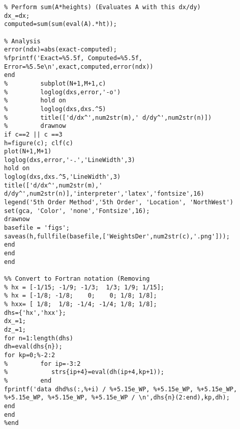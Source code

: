 \begin{verbatim}
% Perform sum(A*heights) (Evaluates A with this dx/dy)
dx_=dx;
computed=sum(sum(eval(A).*ht));

% Analysis
error(ndx)=abs(exact-computed);
%fprintf('Exact=%5.5f, Computed=%5.5f, Error=%5.5e\n',exact,computed,error(ndx))
end
%         subplot(N+1,M+1,c)
%         loglog(dxs,error,'-o')
%         hold on
%         loglog(dxs,dxs.^5)
%         title(['d/dx^',num2str(m),' d/dy^',num2str(n)])
%         drawnow 
if c==2 || c ==3 
h=figure(c); clf(c)  
plot(N+1,M+1)
loglog(dxs,error,'-.','LineWidth',3)
hold on
loglog(dxs,dxs.^5,'LineWidth',3)
title(['d/dx^',num2str(m),' d/dy^',num2str(n)],'interpreter','latex','fontsize',16)
legend('5th Order Method','5th Order', 'Location', 'NorthWest')
set(gca, 'Color', 'none','Fontsize',16);
drawnow 
basefile = 'figs';
saveas(h,fullfile(basefile,['WeightsDer',num2str(c),'.png']));
end
end
end

%% Convert to Fortran notation (Removing
% hx = [-1/15; -1/9; -1/3;  1/3; 1/9; 1/15];
% hx = [-1/8; -1/8;    0;    0; 1/8; 1/8];
% hxx= [ 1/8;  1/8; -1/4; -1/4; 1/8; 1/8];
dhs={'hx','hxx'};
dx_=1;
dz_=1;
for n=1:length(dhs)
dh=eval(dhs{n});
for kp=0;%-2:2
%         for ip=-3:2
%            strs{ip+4}=eval(dh(ip+4,kp+1));
%         end
fprintf('data dhd%s(:,%+i) / %+5.15e_WP, %+5.15e_WP, %+5.15e_WP, %+5.15e_WP, %+5.15e_WP, %+5.15e_WP / \n',dhs{n}(2:end),kp,dh);
end
end
%end

\end{verbatim}